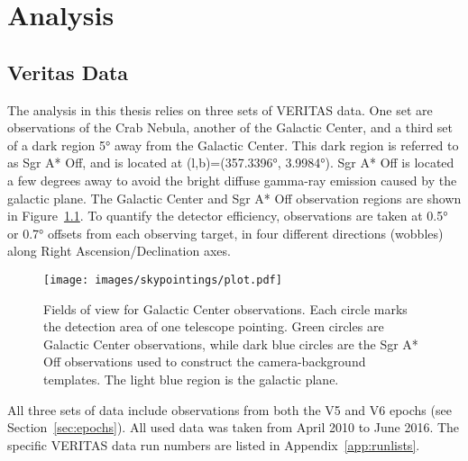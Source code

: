 \cleartooddpage[\thispagestyle{empty}]
\newcommand{\Like}{L}
\newcommand{\LogLike}{\mathcal{L}}
\newcommand{\LogLikeMax}{\LogLike_{\textrm{max}}}
\newcommand{\xtrue}{\mathbf{x }}
\newcommand{\xdet }{\mathbf{x'}}
\newcommand{\ltrue}{\mathbf{l }}
\newcommand{\ldet }{\mathbf{l'}}
\newcommand{\btrue}{\mathbf{b }}
\newcommand{\bdet }{\mathbf{b'}}
\newcommand{\Etrue}{\mathbf{E }}
\newcommand{\Edet }{\mathbf{E'}}
\newcommand{\ttrue}{\mathbf{t }}
\newcommand{\tdet }{\mathbf{t'}}
\newcommand{\Aeff }{A_\textrm{eff }}
\newcommand{\Edisp}{E_\textrm{disp}}
\newcommand{\Mnull}{M_\textrm{null}}
\newcommand{\Malt }{M_\textrm{alt }}
\chapter{Analysis}\label{chapter:analysis}


\section{Veritas Data}\label{veritasdata}
  The analysis in this thesis relies on three sets of VERITAS data.
  One set are observations of the Crab Nebula, another of the Galactic Center, and a third set of a dark region \nicetilde\ang{5} away from the Galactic Center.
  This dark region is referred to as  Sgr A* Off, and is located at (l,b)=(\ang{357.3396}, \ang{3.9984}).
  Sgr A* Off is located a few degrees away to avoid the bright diffuse gamma-ray emission caused by the galactic plane.
  The Galactic Center and Sgr A* Off observation regions are shown in Figure~\ref{fig:gcfieldsofview}.
  To quantify the detector efficiency, observations are taken at \ang{0.5} or \ang{0.7} offsets from each observing target, in four different directions (wobbles) along Right Ascension/Declination axes.

  \begin{figure}[ht]
    \centering
    \texttt{[image: images/skypointings/plot.pdf]}
    \caption[VERITAS Galactic Center Pointings]{
      Fields of view for Galactic Center observations.
      Each circle marks the detection area of one telescope pointing.
      Green circles are Galactic Center observations, while dark blue circles are the Sgr A* Off observations used to construct the camera-background templates.
      The light blue region is the galactic plane.
    }
    \label{fig:gcfieldsofview}
  \end{figure}

  All three sets of data include observations from both the V5 and V6 epochs (see Section~\ref{sec:epochs}).
  All used data was taken from April 2010 to June 2016.
  The specific VERITAS data run numbers are listed in Appendix~\ref{app:runlists}.

